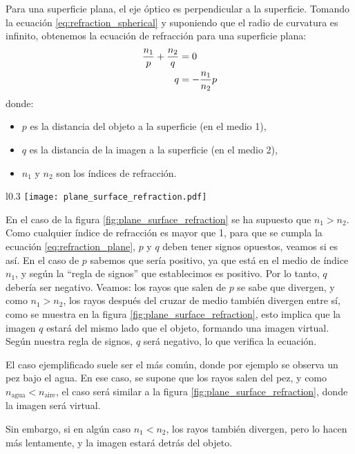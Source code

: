 Para una superficie plana, el eje óptico es perpendicular a la superficie. Tomando la ecuación \ref{eq:refraction_spherical} y suponiendo que el radio de curvatura es infinito, obtenemos la ecuación de refracción para una superficie plana:
\begin{align}
  \frac{n_1}{p} + \frac{n_2}{q} &= 0 \notag \\
  q &= -\frac{n_1}{n_2} p
  \label{eq:refraction_plane}
\end{align}
donde:
\begin{itemize}
  \item \(p\) es la distancia del objeto a la superficie (en el medio 1),
  \item \(q\) es la distancia de la imagen a la superficie (en el medio 2),
  \item \(n_1\) y \(n_2\) son los índices de refracción.
\end{itemize}

\begin{wrapfigure}{l}{0.3\textwidth}
  \texttt{[image: plane\_surface\_refraction.pdf]}
  \caption{Refacción en una superficie plana.}
  \label{fig:plane_surface_refraction}
\end{wrapfigure}
En el caso de la figura \ref{fig:plane_surface_refraction} se ha supuesto que \(n_1 > n_2\). Como cualquier índice de refracción es mayor que 1, para que se cumpla la ecuación \ref{eq:refraction_plane}, \(p\) y \(q\) deben tener signos opuestos, veamos si es así. En el caso de \(p\) sabemos que sería positivo, ya que está en el medio de índice \(n_1\), y según la ``regla de signos'' que establecimos es positivo. Por lo tanto, \(q\) debería ser negativo. Veamos: los rayos que salen de \(p\) se sabe que divergen, y como \(n_1 > n_2\), los rayos después del cruzar de medio también divergen entre sí, como se muestra en la figura \ref{fig:plane_surface_refraction}, esto implica que la imagen \(q\) estará del mismo lado que el objeto, formando una imagen virtual. Según nuestra regla de signos, \(q\) será negativo, lo que verifica la ecuación.

El caso ejemplificado suele ser el más común, donde por ejemplo se observa un pez bajo el agua. En ese caso, se supone que los rayos salen del pez, y como \(n_{\text{agua}} < n_{\text{aire}}\), el caso será similar a la figura \ref{fig:plane_surface_refraction}, donde la imagen será virtual. 

Sin embargo, si en algún caso \(n_1 < n_2\), los rayos también divergen, pero lo hacen más lentamente, y la imagen estará detrás del objeto.

